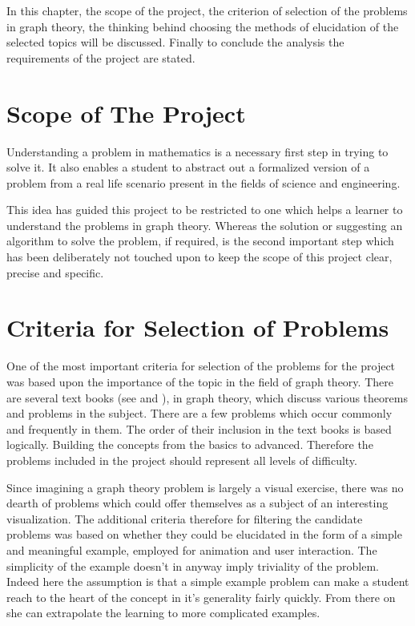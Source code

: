 
In this chapter, the scope of the project, the criterion of selection of the
problems in graph theory, the thinking behind choosing the methods of
elucidation of the selected topics will be discussed. Finally to conclude the analysis
the requirements of the project are stated.


\section{Scope of The Project}

Understanding a problem in mathematics is a necessary first step in trying to solve it.
It also enables a student to abstract out a formalized version of a
problem from a real life scenario present in the fields of science and engineering.

This idea has guided this project to be restricted to one which helps a learner to
understand the problems in graph theory. Whereas the solution or suggesting an
algorithm to solve the problem, if required, is the second important step which
has been deliberately not touched upon to keep the scope of this project
clear, precise and specific.


\section{Criteria for Selection of Problems}
\label{section: selectionCriteria}
One of the most important criteria for selection of the problems for the
project was based upon the importance of the topic in the field of graph
theory. There are several text books (see \cite{Newman10} and
\cite{KleinbergTardos06}), in graph theory, which discuss various theorems and
problems in the subject.  There are a few problems which occur commonly and
frequently in them. The order of their inclusion in the text books is based
logically.  Building the concepts from the basics to advanced. Therefore the
problems included in the project should represent all levels of difficulty.

Since imagining a graph theory problem is largely a visual exercise, there
was no dearth of problems which could offer themselves as a subject of an
interesting visualization. The additional criteria therefore for filtering the
candidate problems was based on whether they could be elucidated in the form of a
simple and meaningful example, employed for animation and user
interaction. The simplicity of the example doesn't in anyway imply
triviality of the problem. Indeed here the assumption is that a simple example
problem can make a student reach to the heart of the concept in it's generality
fairly quickly. From there on she can extrapolate the learning to more
complicated examples.


